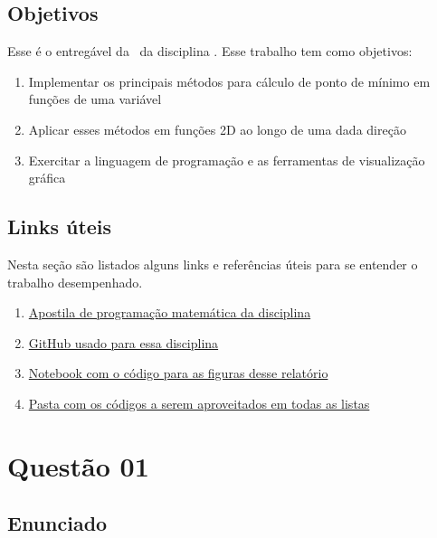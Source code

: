 \documentclass[10pt, a4paper]{article}
\begin{document}
\subsection{Objetivos}

Esse é o entregável da \TITLE \ da disciplina \DISCIPLINE. Esse trabalho tem como objetivos:

\begin{enumerate}
  \item Implementar os principais métodos para cálculo de ponto de mínimo em funções de uma variável
  \item Aplicar esses métodos em funções 2D ao longo de uma dada direção
  \item Exercitar a linguagem de programação e as ferramentas de visualização gráfica
\end{enumerate}

\subsection{Links úteis}\label{links}

Nesta seção são listados alguns links e referências úteis para se entender o trabalho desempenhado.

\begin{enumerate}
  \item \href{https://web.tecgraf.puc-rio.br/~ivan/MEC2403/ProgMatematica_VazPereiraMenezes-Ago2012.pdf}{Apostila de programação matemática da disciplina}
  \item \href{https://github.com/prj-phcp/MEC2403_Activities}{GitHub usado para essa disciplina}
  \item \href{https://github.com/prj-phcp/MEC2403_Activities/blob/master/Trabalho1/Trabalho1.ipynb}{Notebook com o código para as figuras desse relatório}
  \item \href{https://github.com/prj-phcp/MEC2403_Activities/blob/master/packages}{Pasta com os códigos a serem aproveitados em todas as listas}
\end{enumerate}

\section{Questão 01}\label{sec:q01}

\subsection{Enunciado}
\end{document}
